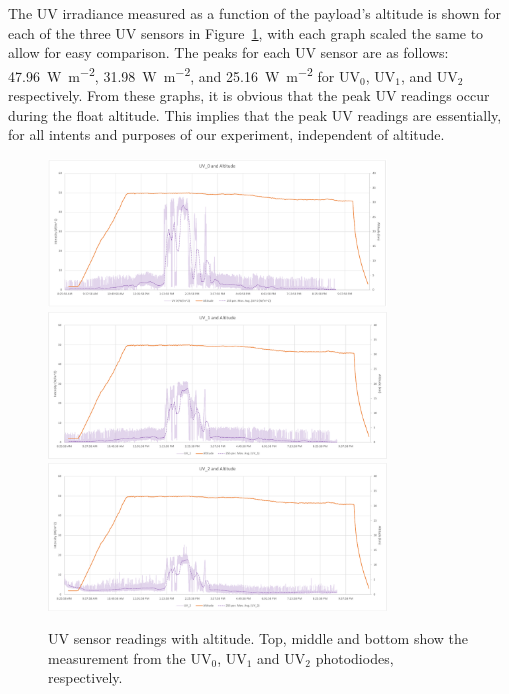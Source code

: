 The UV irradiance measured as a function of the payload's altitude is shown for each of the three UV sensors in Figure~\ref{fig:uv_altitude}, with each graph scaled the same to allow for easy comparison. The peaks for each UV sensor are as follows: \SI{47.96}{\watt\per\meter\squared}, \SI{31.98}{\watt\per\meter\squared}, and \SI{25.16}{\watt\per\meter\squared} for UV$_0$, UV$_1$, and UV$_2$ respectively. From these graphs, it is obvious that the peak UV readings occur during the float altitude. This implies that the peak UV readings are essentially, for all intents and purposes of our experiment, independent of altitude.

\begin{figure}[]
\begin{center}
\includegraphics[width=0.8\textwidth]{./Figures/uv_0_graph.pdf}
\includegraphics[width=0.8\textwidth]{./Figures/uv_1_graph.pdf}
\includegraphics[width=0.8\textwidth]{./Figures/uv_2_graph.pdf}
\caption{UV sensor readings with altitude.  Top, middle and bottom show the measurement from the UV$_0$, UV$_1$ and UV$_2$ photodiodes, respectively.}
\label{fig:uv_altitude} 
\end{center}
\end{figure}




